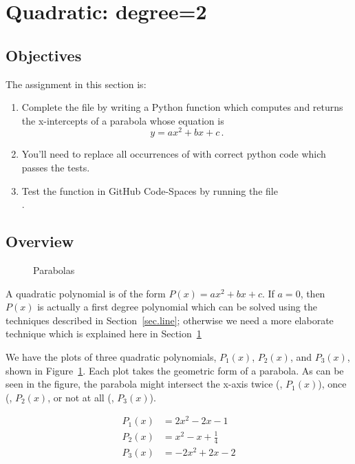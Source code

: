 \section{Quadratic: degree=2}
\label{sec.quadratic}

\subsection{Objectives}
The assignment in this section is:
\begin{enumerate}
\item Complete the file  by writing a Python
  function which computes and returns the x-intercepts of a parabola whose
  equation is \[y=a x^2 + b x + c\,.\]
\item    You'll need to replace all occurrences of 
  with correct python code which passes the tests.

\item Test the function in GitHub Code-Spaces by running the file\\
  .
\end{enumerate}

\subsection{Overview}

\begin{figure}
\centering

\caption{Parabolas}
\label{fig.parabola}
\end{figure}

A quadratic polynomial is of the form $P(x)=a x^2 + b x + c$.  If
$a=0$, then $P(x)$ is actually a first degree polynomial which can be
solved using the techniques described in Section~\ref{sec.line};
otherwise we need a more elaborate technique which is explained here in
Section~\ref{sec.quadratic}

We have the plots of three quadratic polynomials, $P_1(x)$, $P_2(x)$,
and $P_3(x)$, shown in Figure~\ref{fig.parabola}.  Each plot takes the
geometric form of a parabola.  As can be seen in the figure, the
parabola might intersect the x-axis twice (\eg, $P_1(x)$), once (\eg,
$P_2(x)$, or not at all (\eg, $P_3(x)$).

\begin{align*}
  P_1(x) &= 2x^2 - 2 x - 1\\
  P_2(x) &= x^2 -x + \frac{1}{4}\\
  P_3(x) &=  -2x^2 + 2x -2
\end{align*}


